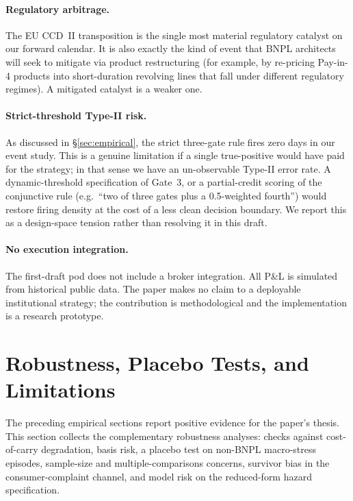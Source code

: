 \documentclass[11pt,letterpaper]{article}
\begin{document}
\paragraph{Regulatory arbitrage.}
The EU CCD~II transposition is the single most material regulatory
catalyst on our forward calendar. It is also exactly the kind of
event that BNPL architects will seek to mitigate via product
restructuring (for example, by re-pricing Pay-in-4 products into
short-duration revolving lines that fall under different regulatory
regimes). A mitigated catalyst is a weaker one.

\paragraph{Strict-threshold Type-II risk.}
As discussed in \S\ref{sec:empirical}, the strict three-gate rule fires
zero days in our event study. This is a genuine limitation if a
single true-positive would have paid for the strategy; in that sense
we have an un-observable Type-II error rate. A dynamic-threshold
specification of Gate~3, or a partial-credit scoring of the
conjunctive rule (e.g.\ ``two of three gates plus a 0.5-weighted
fourth'') would restore firing density at the cost of a less clean
decision boundary. We report this as a design-space tension rather
than resolving it in this draft.

\paragraph{No execution integration.}
The first-draft pod does not include a broker integration. All P\&L
is simulated from historical public data. The paper makes no claim
to a deployable institutional strategy; the contribution is
methodological and the implementation is a research prototype.


\section{Robustness, Placebo Tests, and Limitations}
\label{sec:robustness}

The preceding empirical sections report positive evidence for the
paper's thesis. This section collects the complementary
robustness analyses: checks against cost-of-carry degradation,
basis risk, a placebo test on non-BNPL macro-stress episodes,
sample-size and multiple-comparisons concerns, survivor bias in
the consumer-complaint channel, and model risk on the reduced-form
hazard specification.
\end{document}
